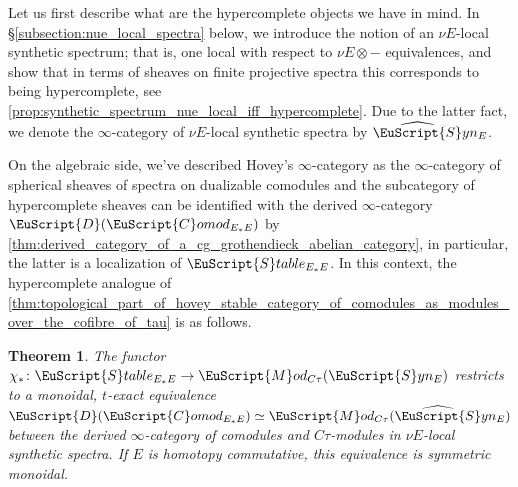 \documentclass[oneside,a4paper]{amsart}
\newcommand{\euscr}[1]{\EuScript{#1}} %
\newcommand{\dcat}{\euscr{D}} %
\newcommand{\stableE}{\euscr{S}table_{E_{*}E}} %
\newcommand{\synspectra}{\euscr{S}yn} %
\newcommand{\hpsynspectra}{\widehat{\euscr{S}}yn} %
\newcommand{\Comod}{\euscr{C}omod} %
\newcommand{\ComodE}{\Comod_{E_{*}E}} %
\newcommand{\Mod}{\euscr{M}od} %
\theoremstyle{plain}
\newtheorem{thm}{Theorem}[section]
\theoremstyle{definition}
\theoremstyle{remark}
\begin{document}
Let us first describe what are the hypercomplete objects we have in mind. In \S\ref{subsection:nue_local_spectra} below, we introduce the notion of an $\nu E$-local synthetic spectrum; that is, one local with respect to $\nu E \otimes -$ equivalences, and show that in terms of sheaves on finite projective spectra this corresponds to being hypercomplete, see \cref{prop:synthetic_spectrum_nue_local_iff_hypercomplete}. Due to the latter fact, we denote the $\infty$-category of $\nu E$-local synthetic spectra by $\hpsynspectra_{E}$.

On the algebraic side, we've described Hovey's $\infty$-category as the $\infty$-category of spherical sheaves of spectra on dualizable comodules and the subcategory of hypercomplete sheaves can be identified with the derived $\infty$-category $\dcat(\ComodE)$ by \cref{thm:derived_category_of_a_cg_grothendieck_abelian_category}, in particular, the latter is a localization of $\stableE$. In this context, the hypercomplete analogue of  \cref{thm:topological_part_of_hovey_stable_category_of_comodules_as_modules_over_the_cofibre_of_tau} is as follows. 

\begin{thm}
\label{thm:ctau_modules_in_hypercomplete_synthetic_spectra_same_as_the_derived_infty_category}
The functor $\chi_{*} \colon \stableE \rightarrow \Mod_{C\tau}(\synspectra_{E})$ restricts to a monoidal, $t$-exact equivalence $\dcat(\ComodE) \simeq \Mod_{C\tau}(\hpsynspectra_{E})$ between the derived $\infty$-category of comodules and $C\tau$-modules in $\nu E$-local synthetic spectra. If $E$ is homotopy commutative, this equivalence is symmetric monoidal. 
\end{thm}
\end{document}
